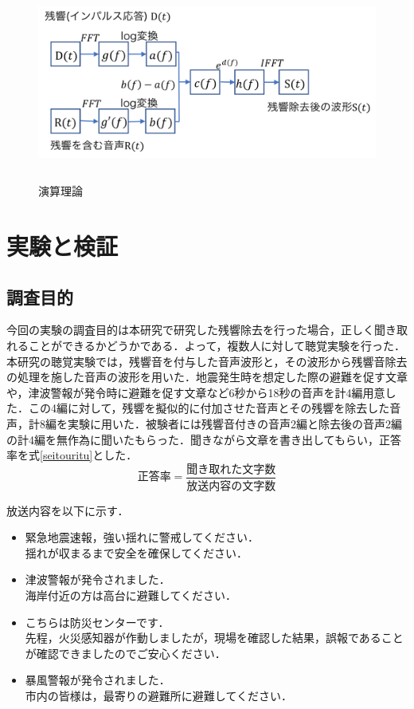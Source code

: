 \documentclass[a4j,11pt]{jsarticle}
\begin{document}
\begin{figure}[h]
\begin{center}
 \includegraphics[clip,width=140mm,height=65mm]{riron.pdf}
\end{center}
 \caption{演算理論}
 \label{fig:cepstrum}
\end{figure}


\newpage
\section{実験と検証}
\subsection{調査目的}
今回の実験の調査目的は本研究で研究した残響除去を行った場合，正しく聞き取れることができるかどうかである．よって，複数人に対して聴覚実験を行った．本研究の聴覚実験では，残響音を付与した音声波形と，その波形から残響音除去の処理を施した音声の波形を用いた．地震発生時を想定した際の避難を促す文章や，津波警報が発令時に避難を促す文章など6秒から18秒の音声を計4編用意した．この4編に対して，残響を擬似的に付加させた音声とその残響を除去した音声，計8編を実験に用いた．被験者には残響音付きの音声2編と除去後の音声2編の計4編を無作為に聞いたもらった．聞きながら文章を書き出してもらい，正答率を式\ref{seitouritu}とした．
\begin{equation}
	\label{seitouritu}
  正答率 = \frac{聞き取れた文字数}{放送内容の文字数}
\end{equation}

放送内容を以下に示す．
\begin{itemize}
\item 緊急地震速報，強い揺れに警戒してください．\\
揺れが収まるまで安全を確保してください．
\item 津波警報が発令されました．\\
海岸付近の方は高台に避難してください．
\item こちらは防災センターです．\\
先程，火災感知器が作動しましたが，現場を確認した結果，誤報であることが確認できましたのでご安心ください．
\item 暴風警報が発令されました．\\
市内の皆様は，最寄りの避難所に避難してください．
\end{itemize}
\end{document}
